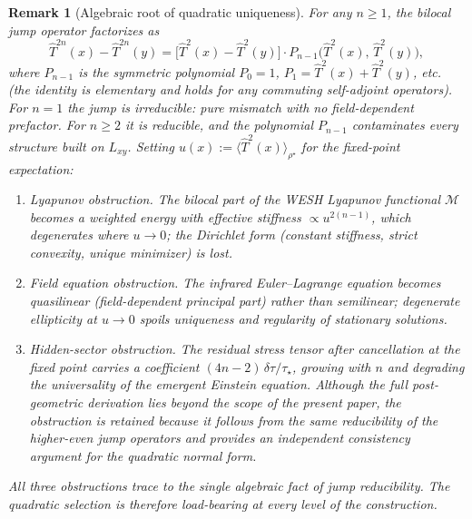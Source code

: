 \documentclass[12pt,a4paper]{article}
\newtheorem{remark}{Remark}[section]
\numberwithin{equation}{section}
\begin{document}
\begin{remark}[Algebraic root of quadratic uniqueness]
\label{rem:algebraic-T2}
For any $n \ge 1$, the bilocal jump operator factorizes as
\[
\hat T^{2n}(x) - \hat T^{2n}(y) = \bigl[\hat T^2(x) - \hat T^2(y)\bigr]\cdot P_{n-1}\bigl(\hat T^2(x),\, \hat T^2(y)\bigr),
\]
where $P_{n-1}$ is the symmetric polynomial $P_0 = 1$, $P_1 = \hat T^2(x) + \hat T^2(y)$, etc. (the identity is elementary and holds for any commuting self-adjoint operators). For $n = 1$ the jump is \emph{irreducible}: pure mismatch with no field-dependent prefactor. For $n \ge 2$ it is \emph{reducible}, and the polynomial $P_{n-1}$ contaminates every structure built on $L_{xy}$. Setting $u(x) := \langle\hat T^2(x)\rangle_{\rho^\star}$ for the fixed-point expectation:
\begin{enumerate}[label=(\alph*),leftmargin=1.5cm,itemsep=0.15em]
\item \emph{Lyapunov obstruction.} The bilocal part of the WESH Lyapunov functional $\mathcal{M}$ becomes a weighted energy with effective stiffness $\propto u^{2(n-1)}$, which degenerates where $u \to 0$; the Dirichlet form (constant stiffness, strict convexity, unique minimizer) is lost.
\item \emph{Field equation obstruction.} The infrared Euler--Lagrange equation becomes quasilinear (field-dependent principal part) rather than semilinear; degenerate ellipticity at $u \to 0$ spoils uniqueness and regularity of stationary solutions.
\item \emph{Hidden-sector obstruction.} The residual stress tensor after cancellation at the fixed point carries a coefficient $(4n{-}2)\,\delta\tau/\tau_\star$, growing with $n$ and degrading the universality of the emergent Einstein equation. Although the full post-geometric derivation lies beyond the scope of the present paper, the obstruction is retained because it follows from the same reducibility of the higher-even jump operators and provides an independent consistency argument for the quadratic normal form.
\end{enumerate}
All three obstructions trace to the single algebraic fact of jump reducibility. The quadratic selection is therefore load-bearing at every level of the construction.
\end{remark}
\end{document}

